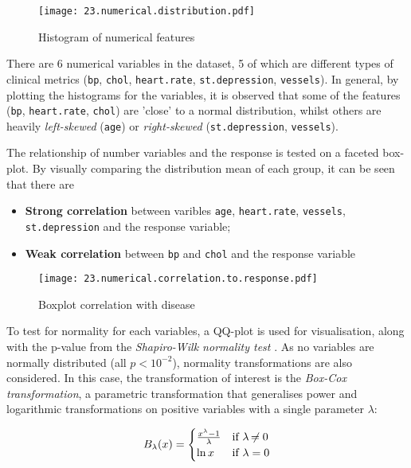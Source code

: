 \begin{figure}[h]
    \texttt{[image: 23.numerical.distribution.pdf]}
    \caption{\centering Histogram of numerical features}
\end{figure}

There are 6 numerical variables in the dataset, 5 of which are different types of clinical metrics 
(\texttt{bp}, \texttt{chol}, \texttt{heart.rate}, \texttt{st.depression}, \texttt{vessels}). In general, by plotting the histograms for the variables, it is observed that some of the features (\texttt{bp}, \texttt{heart.rate}, \texttt{chol}) are 'close' to a normal distribution, whilst others are heavily \textit{left-skewed} (\texttt{age}) or \textit{right-skewed} (\texttt{st.depression}, \texttt{vessels}).


The relationship of number variables and the response is tested on a faceted box-plot. By visually comparing the distribution mean of each group, it can be seen that there are 

\begin{itemize}
    \item \textbf{Strong correlation} between varibles \texttt{age}, \texttt{heart.rate}, \texttt{vessels}, \texttt{st.depression} and the response variable;
    \item \textbf{Weak correlation} between \texttt{bp} and \texttt{chol} and the response variable
\end{itemize}

\begin{figure}[h]
    \centering
    \texttt{[image: 23.numerical.correlation.to.response.pdf]}
    \caption{\centering Boxplot correlation with disease}
\end{figure}

To test for normality for each variables, a QQ-plot is used for visualisation, along with the p-value from the \textit{Shapiro-Wilk normality test} \citep{shapirotest}. As no variables are normally distributed (all \( p < 10^{-2} \)), normality transformations are also considered. In this case, the transformation of interest is the \textit{Box-Cox transformation}, a parametric transformation that generalises power and logarithmic transformations on positive variables with a single parameter \( \lambda \):

\[
    B_\lambda(x) = \begin{cases}
        \frac{x^\lambda - 1}{\lambda}   & \text{if \( \lambda \ne 0 \)} \\
        \ln{x}                          & \text{if \( \lambda  =  0 \)}
    \end{cases}
\]

